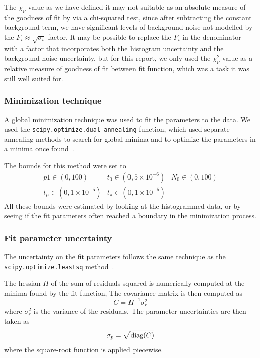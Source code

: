 \documentclass[11pt,a4paper]{article}
\begin{document}
The \(\chi_\nu\) value as we have defined it may not suitable as an absolute measure of the goodness of fit by via a chi-squared test, since after subtracting the constant background term, we have significant levels of background noise not modelled by the \(F_i \approx \sqrt{\sigma_i}\) factor. It may be possible to replace the \(F_i\) in the denominator with a factor that incorporates both the histogram uncertainty and the background noise uncertainty, but for this report, we only used the \(\chi_\nu^2\) value as a relative measure of goodness of fit between fit function, which was a task it was still well suited for.

\subsubsection{Minimization technique}
A global minimization technique was used to fit the parameters to the data. We used the \verb|scipy.optimize.dual_annealing| function, which used separate annealing methods to search for global minima and to optimize the parameters in a minima once found~\cite{scipy_dual_annealing}.

The bounds for this method were set to
\[
\begin{array}{c|c|c}
p1 \in (0,  100) & t_0 \in (0, 5\times 10^{-6}) & N_0 \in (0, 100)\\
t_\mu \in (0, 1\times 10^{-5}) & t_\pi \in (0, 1\times 10^{-5}) &
\end{array}
\]
All these bounds were estimated by looking at the histogrammed data, or by seeing if the fit parameters often reached a boundary in the minimization process.

\subsubsection{Fit parameter uncertainty}
The uncertainty on the fit parameters follows the same technique as the\\
\verb|scipy.optimize.leastsq| method~\cite{scipy_hessian}.

The hessian \(H\) of the sum of residuals squared is numerically computed at the minima found by the fit function, The covariance matrix is then computed as
\begin{equation}
C = H^{-1}\sigma_r^2
\end{equation}
where \(\sigma_r^2\) is the variance of the residuals.
The parameter uncertainties are then taken as
\begin{equation}
    \sigma_p = \sqrt{\textnormal{diag}(C)}
\end{equation}
where the square-root function is applied piecewise.
\end{document}
